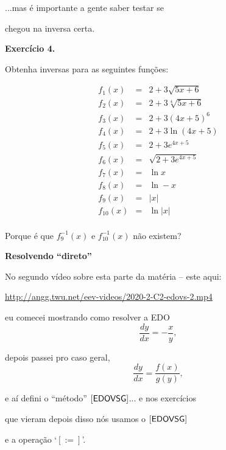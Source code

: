 \documentclass[oneside,12pt]{article}
\begin{document}
...mas é importante a gente saber testar se

chegou na inversa certa.


\newpage


{\bf Exercício 4.} 

Obtenha inversas para as seguintes funções:

%
$$\begin{array}{rcl}
  f_1(x) &=& 2 + 3 \sqrt   {5x+6} \\
  f_2(x) &=& 2 + 3 \sqrt[4]{5x+6} \\
  f_3(x) &=& 2 + 3 (4x+5)^6 \\
  f_4(x) &=& 2 + 3 \ln(4x + 5) \\
  f_5(x) &=& 2 + 3 e^{4x + 5} \\
  f_6(x) &=& \sqrt{2 + 3 e^{4x + 5}} \\[10pt]
  f_7(x) &=& \ln x \\
  f_8(x) &=& \ln -x\\
  f_9(x) &=& |x|\\
  f_{10}(x) &=& \ln |x|\\
  \end{array}
$$

\msk

Porque é que $f_9^{-1}(x)$ e $f_{10}^{-1}(x)$ não existem?


\newpage


{\bf Resolvendo ``direto''}

No segundo vídeo sobre esta parte da matéria -- este aqui:

\ssk

{\footnotesize

\url{http://angg.twu.net/eev-videos/2020-2-C2-edovs-2.mp4}

}

\ssk

eu comecei mostrando como resolver a EDO $$\frac{dy}{dx} = - \frac xy,$$

depois passei pro caso geral, $$\frac{dy}{dx} = \frac{f(x)}{g(y)},$$

e aí defini o ``método'' $\mathsf{[EDOVSG]}$... e nos exercícios

que vieram depois disso nós usamos o $\mathsf{[EDOVSG]}$

e a operação `$[:=]$'.


\newpage

\end{document}

